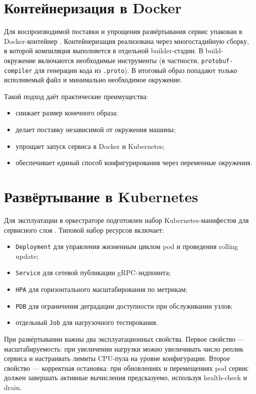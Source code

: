 \section{Контейнеризация в Docker}

Для воспроизводимой поставки и упрощения развёртывания сервис упакован в Docker-контейнер \cite{docker_docs}.  
Контейнеризация реализована через многостадийную сборку, в которой компиляция выполняется в отдельной builder-стадии.  
В build-окружение включаются необходимые инструменты (в частности, \texttt{protobuf-compiler} для генерации кода из \texttt{.proto}).  
В итоговый образ попадают только исполняемый файл и минимально необходимое окружение.  

Такой подход даёт практические преимущества:
\begin{itemize}
\item снижает размер конечного образа;  
\item делает поставку независимой от окружения машины;  
\item упрощает запуск сервиса в Docker и Kubernetes;  
\item обеспечивает единый способ конфигурирования через переменные окружения.  
\end{itemize}

\section{Развёртывание в Kubernetes}

Для эксплуатации в оркестраторе подготовлен набор Kubernetes-манифестов для сервисного слоя \cite{kubernetes_docs}.  
Типовой набор ресурсов включает:
\begin{itemize}
\item \texttt{Deployment} для управления жизненным циклом pod и проведения rolling update;  
\item \texttt{Service} для сетевой публикации gRPC-эндпоинта;  
\item \texttt{HPA} для горизонтального масштабирования по метрикам;  
\item \texttt{PDB} для ограничения деградации доступности при обслуживании узлов;  
\item отдельный \texttt{Job} для нагрузочного тестирования.  
\end{itemize}

При развёртывании важны два эксплуатационных свойства.  
Первое свойство --- масштабируемость: при увеличении нагрузки можно увеличивать число реплик сервиса и настраивать лимиты CPU-пула на уровне конфигурации.  
Второе свойство --- корректная остановка: при обновлениях и перемещениях pod сервис должен завершать активные вычисления предсказуемо, используя health-check и drain.  

